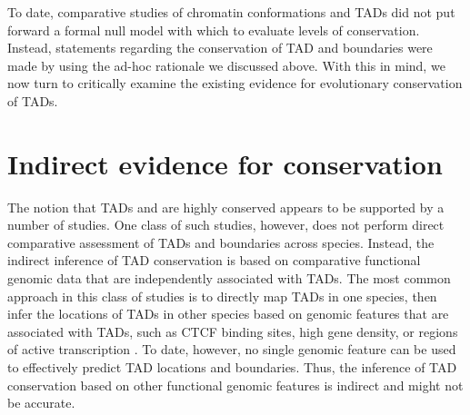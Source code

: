 To date, comparative studies of chromatin conformations and TADs did not put forward a formal null model with which to evaluate levels of conservation. Instead, statements regarding the conservation of TAD and boundaries were made by using the ad-hoc rationale we discussed above. With this in mind, we now turn to critically examine the existing evidence for evolutionary conservation of TADs.

\section{Indirect evidence for conservation}
The notion that TADs and are highly conserved appears to be supported by a number of studies. One class of such studies, however, does not perform direct comparative assessment of TADs and boundaries across species. Instead, the indirect inference of TAD conservation is based on comparative functional genomic data that are independently associated with TADs. The most common approach in this class of studies is to directly map TADs in one species, then infer the locations of TADs in other species based on genomic features that are associated with TADs, such as CTCF binding sites, high gene density, or regions of active transcription \cite{Dixon.2012, Nora.2012, Rudan.2015, Kentepozidou.2020, Dekker.2015}. To date, however, no single genomic feature can be used to effectively predict TAD locations and boundaries. Thus, the inference of TAD conservation based on other functional genomic features is indirect and might not be accurate. 

